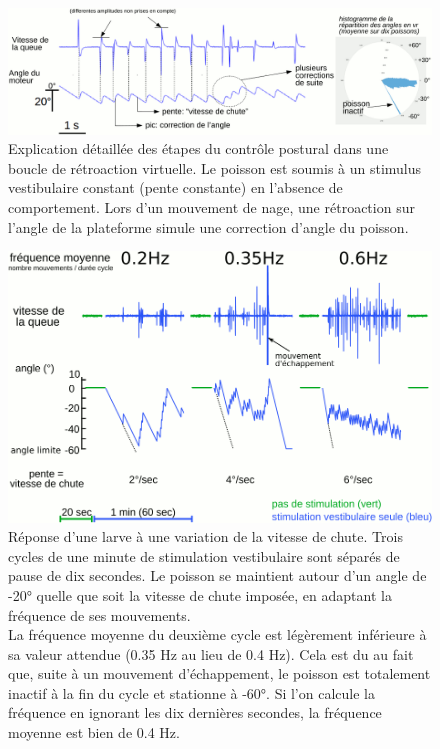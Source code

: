 \begin{figure}
    \centering
    \includegraphics[width=\textwidth]{./files/vestibular_feedback.svg.png}
    \caption{Explication détaillée des étapes du contrôle postural dans une boucle de rétroaction virtuelle. Le poisson est soumis à un stimulus vestibulaire constant (pente constante) en l'absence de comportement. Lors d'un mouvement de nage, une rétroaction sur l'angle de la plateforme simule une correction d'angle du poisson.
    \label{FIGvirtualposturalcontrol}}
    \end{figure}

    
\begin{figure}
    \centering
    \includegraphics[width=\textwidth]{./files/variation-vitesse.svg.png}
    \caption{
    Réponse d'une larve à une variation de la vitesse de chute. Trois cycles de une minute de stimulation vestibulaire sont séparés de pause de dix secondes. Le poisson se maintient autour d'un angle de -20° quelle que soit la vitesse de chute imposée, en adaptant la fréquence de ses mouvements.
    \\La fréquence moyenne du deuxième cycle est légèrement inférieure à sa valeur attendue (0.35 Hz au lieu de 0.4 Hz). Cela est du au fait que, suite à un mouvement d'échappement, le poisson est totalement inactif à la fin du cycle et stationne à -60°. Si l'on calcule la fréquence en ignorant les dix dernières secondes, la fréquence moyenne est bien de 0.4 Hz.
    \label{FIGvariationvitesse}}
    \end{figure}


